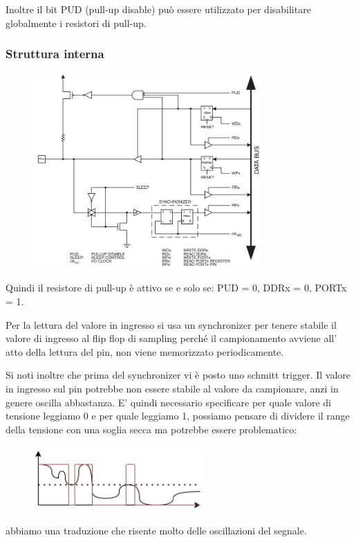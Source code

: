 Inoltre il bit PUD (pull-up disable) può essere utilizzato per disabilitare globalmente i resistori di pull-up.

\subsubsection{Struttura interna}
\begin{figure}[H]
    \centering
    \includegraphics[width=330px]{images/21_GPIO/gpio_internal_structure.png}
\end{figure}
Quindi il resistore di pull-up è attivo se e solo se:
PUD = 0, DDRx = 0, PORTx = 1.

Per la lettura del valore in ingresso si usa un synchronizer per tenere stabile il valore di ingresso al flip flop di sampling perché il campionamento avviene all' atto della lettura del pin, non viene memorizzato periodicamente.

Si noti inoltre che prima del synchronizer vi è posto uno schmitt trigger.
Il valore in ingresso sul pin potrebbe non essere stabile al valore da campionare, anzi in genere oscilla abbastanza.
E' quindi necessario specificare per quale valore di tensione leggiamo 0 e per quale leggiamo 1, possiamo pensare di dividere il range della tensione con una soglia secca ma potrebbe essere problematico:
\begin{figure}[H]
    \centering
    \includegraphics[width=250px]{images/21_GPIO/single_threshold.png}
\end{figure}
abbiamo una traduzione che risente molto delle oscillazioni del segnale.


